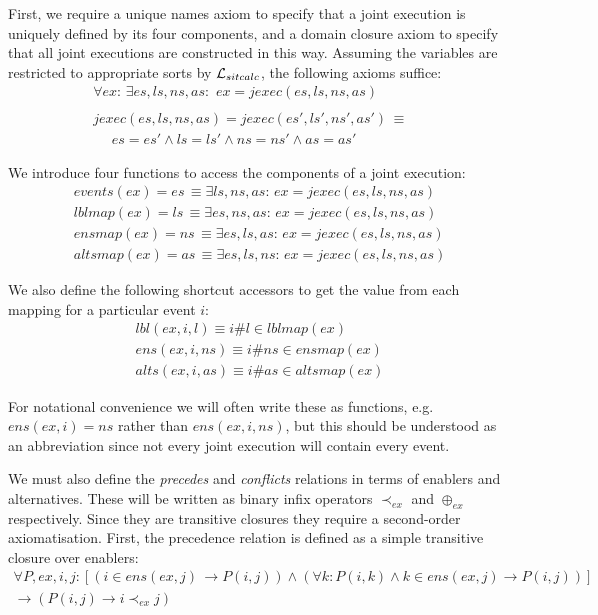First, we require a unique names axiom to specify that a joint execution
is uniquely defined by its four components, and a domain closure axiom
to specify that all joint executions are constructed in this way.
Assuming the variables are restricted to appropriate sorts by $\mathcal{L}_{sitcalc}$,
the following axioms suffice:\begin{gather*}
\forall ex:\,\exists es,ls,ns,as:\,\, ex=jexec(es,ls,ns,as)\\
\\jexec(es,ls,ns,as)=jexec(es',ls',ns',as')\,\equiv\,\,\,\,\,\,\,\,\\
\,\,\,\,\,\,\,\, es=es'\wedge ls=ls'\wedge ns=ns'\wedge as=as'\end{gather*}


We introduce four functions to access the components of a joint execution:\begin{gather*}
events(ex)=es\,\equiv\exists ls,ns,as:\, ex=jexec(es,ls,ns,as)\\
lblmap(ex)=ls\,\equiv\exists es,ns,as:\, ex=jexec(es,ls,ns,as)\\
ensmap(ex)=ns\,\equiv\exists es,ls,as:\, ex=jexec(es,ls,ns,as)\\
altsmap(ex)=as\,\equiv\exists es,ls,ns:\, ex=jexec(es,ls,ns,as)\end{gather*}


We also define the following shortcut accessors to get the value from
each mapping for a particular event $i$:\begin{gather*}
lbl(ex,i,l)\equiv i\#l\in lblmap(ex)\\
ens(ex,i,ns)\equiv i\#ns\in ensmap(ex)\\
alts(ex,i,as)\equiv i\#as\in altsmap(ex)\end{gather*}


For notational convenience we will often write these as functions,
e.g. $ens(ex,i)=ns$ rather than $ens(ex,i,ns)$, but this should
be understood as an abbreviation since not every joint execution will
contain every event.

We must also define the \emph{precedes} and \emph{conflicts} relations
in terms of enablers and alternatives. These will be written as binary
infix operators $\prec_{ex}$ and $\oplus_{ex}$ respectively. Since
they are transitive closures they require a second-order axiomatisation.
First, the precedence relation is defined as a simple transitive closure
over enablers:\begin{multline*}
\forall P,ex,i,j:\left[\left(i\in ens(ex,j)\,\rightarrow P(i,j)\right)\wedge\left(\forall k:P(i,k)\wedge k\in ens(ex,j)\rightarrow P(i,j)\right)\right]\\
\rightarrow\left(P(i,j)\rightarrow i\prec_{ex}j\right)\end{multline*}


